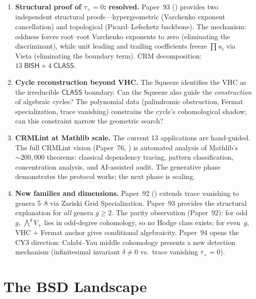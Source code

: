 \documentclass[11pt]{article}
\theoremstyle{plain}
\theoremstyle{definition}
\theoremstyle{remark}
\newcommand{\BISH}{\mathsf{BISH}}
\newcommand{\CLASS}{\mathsf{CLASS}}
\begin{document}
\begin{enumerate}[label=(\arabic*)]
\item \textbf{Structural proof of $\tau_+ = 0$: resolved.}  Paper~93
  () provides two independent structural
  proofs---hypergeometric (Varchenko exponent cancellation) and
  topological (Picard--Lefschetz backbone).  The mechanism: oddness
  forces root--root Varchenko exponents to zero (eliminating the
  discriminant), while unit leading and trailing coefficients freeze
  $\prod u_i$ via Vieta (eliminating the boundary term).  CRM
  decomposition: $13\;\BISH + 4\;\CLASS$.

\item \textbf{Cycle reconstruction beyond VHC.}  The Squeeze
  identifies the VHC as the irreducible $\CLASS$ boundary.  Can
  the Squeeze also guide the \emph{construction} of algebraic
  cycles?  The polynomial data (palindromic obstruction, Fermat
  specialization, trace vanishing) constrains the cycle's
  cohomological shadow; can this constraint narrow the geometric
  search?

\item \textbf{CRMLint at Mathlib scale.}  The current 13
  applications are hand-guided.  The full CRMLint vision (Paper~76,
  \cite{p76}) is automated analysis of Mathlib's ${\sim}200{,}000$
  theorems: classical dependency tracing, pattern classification,
  concentration analysis, and AI-assisted audit.  The generative
  phase demonstrates the protocol works; the next phase is scaling.

\item \textbf{New families and dimensions.}  Paper~92
  () extends trace vanishing to genera 5--8
  via Zariski Grid Specialization.  Paper~93 provides the structural
  explanation for \emph{all} genera $g \geq 2$.  The parity
  observation (Paper~92): for odd~$g$, $\bigwedge^g V_+$ lies in
  odd-degree cohomology, so no Hodge class exists; for even~$g$,
  VHC + Fermat anchor gives conditional algebraicity.  Paper~94
  opens the CY3 direction: Calabi--Yau middle cohomology presents
  a new detection mechanism (infinitesimal invariant $\delta \neq 0$
  vs.\ trace vanishing $\tau_+ = 0$).
\end{enumerate}


\part{The BSD Landscape}\label{part:bsd}
\end{document}
